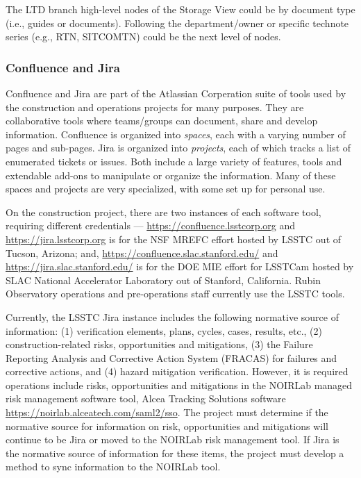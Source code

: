 The LTD branch high-level nodes of the Storage View could be by document type (i.e., guides or documents).
Following the department/owner or specific technote series (e.g., RTN, SITCOMTN) could be the next level of nodes.

\subsubsection{Confluence and Jira}
\label{confluence-jira-storage}

Confluence \citep{Confluence-cite} and Jira \citep{Jira-cite} are part of the Atlassian Corperation suite of tools used by the construction and operations projects for many purposes.
They are collaborative tools where teams/groups can document, share and develop information.
Confluence is organized into \emph{spaces}, each with a varying number of pages and sub-pages.
Jira is organized into \emph{projects}, each of which tracks a list of enumerated tickets or issues.
Both include a large variety of features, tools and extendable add-ons to manipulate or organize the information.
Many of these spaces and projects are very specialized, with some set up for personal use.

On the construction project, there are two instances of each software tool, requiring different credentials --- \url{https://confluence.lsstcorp.org} and \url{https://jira.lsstcorp.org} is for the NSF MREFC effort hosted by LSSTC out of Tucson, Arizona; and, \url{https://confluence.slac.stanford.edu/} and \url{https://jira.slac.stanford.edu/} is for the DOE MIE effort for LSSTCam hosted by SLAC National Accelerator Laboratory out of Stanford, California.
Rubin Observatory operations and pre-operations staff currently use the LSSTC tools.

Currently, the LSSTC Jira instance includes the following normative source of information:
(1) verification elements, plans, cycles, cases, results, etc.,
(2) construction-related risks, opportunities and mitigations,
(3) the Failure Reporting Analysis and Corrective Action System (FRACAS) for failures and corrective actions,
and (4) hazard mitigation verification.
However, it is required operations include risks, opportunities and mitigations in the NOIRLab managed risk management software tool, Alcea Tracking Solutions software \url{https://noirlab.alceatech.com/saml2/sso}.
The project must determine if the normative source for information on risk, opportunities and mitigations will continue to be Jira or moved to the NOIRLab risk management tool.
If Jira is the normative source of information for these items, the project must develop a method to sync information to the NOIRLab tool.

